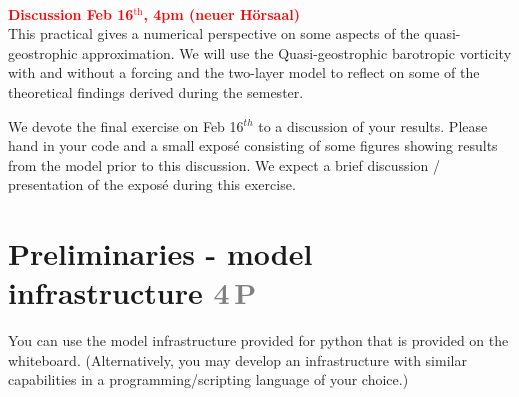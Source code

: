 \documentclass[jobname=project, 10pt]{article}
\newcommand{\task}[2]{\section{#1 \hfill \normalsize\normalfont \textcolor{gray}{#2\,P}}\addtocounter{ptot}{#2}}
\newcounter{ptot}
\begin{document}
~\\[-3em]
\phantom{AA}\hfill \textcolor{red}{\textbf{Discussion Feb 16$^\mathrm{th}$, 4pm (neuer H\"orsaal)}} \\
This practical gives a numerical perspective on some aspects of the quasi-geostrophic approximation.
We will use the Quasi-geostrophic barotropic vorticity with and without a forcing and the two-layer model
to reflect on some of the theoretical findings derived during the semester.
%
\par
% 
We devote the final exercise on Feb 16$^{th}$ to a discussion of your results. Please hand in your code and a small expos\'e consisting of some figures showing results from the model prior to this discussion. We expect a brief discussion / presentation of the expos\'e during this exercise. 

\task{Preliminaries - model infrastructure}{4}

You can use the model infrastructure provided for python that is provided on the whiteboard. (Alternatively, you may develop an infrastructure with similar capabilities in a programming/scripting language of your choice.) \\ 
\end{document}
